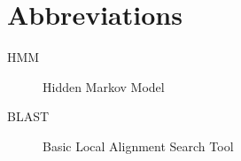 \chapter*{Abbreviations}\label{abbr}
\begin{description}
	\item[HMM] Hidden Markov Model
	\item[BLAST] Basic Local Alignment Search Tool
\end{description}
